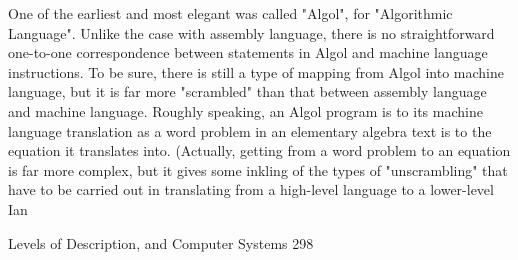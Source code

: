        One of the earliest and most elegant was called "Algol", for "Algorithmic
       Language". Unlike the case with assembly language, there is no straightforward
       one-to-one correspondence between statements in Algol and machine language
       instructions. To be sure, there is still a type of mapping from Algol into machine
       language, but it is far more "scrambled" than that between assembly language and
       machine language. Roughly speaking, an Algol program is to its machine
       language translation as a word problem in an elementary algebra text is to the
       equation it translates into. (Actually, getting from a word problem to an equation
       is far more complex, but it gives some inkling of the types of "unscrambling" that
       have to be carried out in translating from a high-level language to a lower-level
       Ian




Levels of Description, and Computer Systems                                          298

